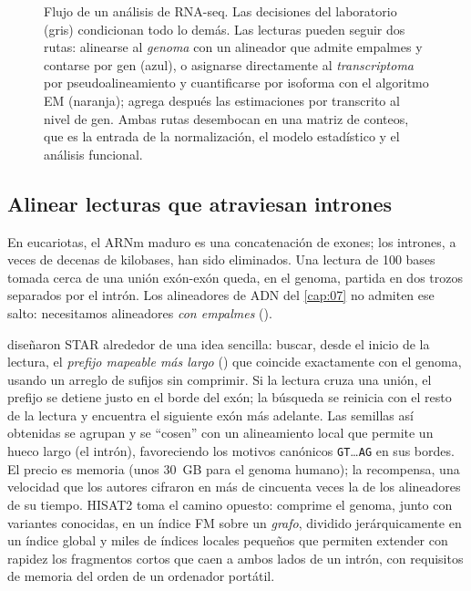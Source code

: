 \begin{figure}[t]
\begin{tikzpicture}[font=\sffamily\scriptsize,
  paso/.style={caja=#1,font=\sffamily\scriptsize,text width=2.3cm,minimum height=1.05cm,inner sep=3pt},
  node distance=0.3cm]
\end{tikzpicture}
\caption[Flujo de un análisis de RNA-seq]{Flujo de un análisis de RNA-seq. Las decisiones del laboratorio (gris) condicionan todo lo demás. Las lecturas pueden seguir dos rutas: alinearse al \emph{genoma} con un alineador que admite empalmes y contarse por gen (azul), o asignarse directamente al \emph{transcriptoma} por pseudoalineamiento y cuantificarse por isoforma con el algoritmo EM (naranja);  agrega después las estimaciones por transcrito al nivel de gen. Ambas rutas desembocan en una matriz de conteos, que es la entrada de la normalización, el modelo estadístico y el análisis funcional.}
\label{fig:11-flujo}
\end{figure}

\subsection{Alinear lecturas que atraviesan intrones}

En eucariotas, el ARNm maduro es una concatenación de exones; los intrones, a veces de decenas de kilobases, han sido eliminados. Una lectura de 100 bases tomada cerca de una unión exón-exón queda, en el genoma, partida en dos trozos separados por el intrón. Los alineadores de ADN del \cref{cap:07} no admiten ese salto: necesitamos alineadores \emph{con empalmes} ().

\textcite{c11-dobin2013} diseñaron STAR alrededor de una idea sencilla: buscar, desde el inicio de la lectura, el \emph{prefijo mapeable más largo} () que coincide exactamente con el genoma, usando un arreglo de sufijos sin comprimir. Si la lectura cruza una unión, el prefijo se detiene justo en el borde del exón; la búsqueda se reinicia con el resto de la lectura y encuentra el siguiente exón más adelante. Las semillas así obtenidas se agrupan y se ``cosen'' con un alineamiento local que permite un hueco largo (el intrón), favoreciendo los motivos canónicos \texttt{GT}\ldots\texttt{AG} en sus bordes. El precio es memoria (unos \SI{30}{GB} para el genoma humano); la recompensa, una velocidad que los autores cifraron en más de cincuenta veces la de los alineadores de su tiempo. HISAT2 \parencite{c11-kim2019} toma el camino opuesto: comprime el genoma, junto con variantes conocidas, en un índice FM sobre un \emph{grafo}, dividido jerárquicamente en un índice global y miles de índices locales pequeños que permiten extender con rapidez los fragmentos cortos que caen a ambos lados de un intrón, con requisitos de memoria del orden de un ordenador portátil.

